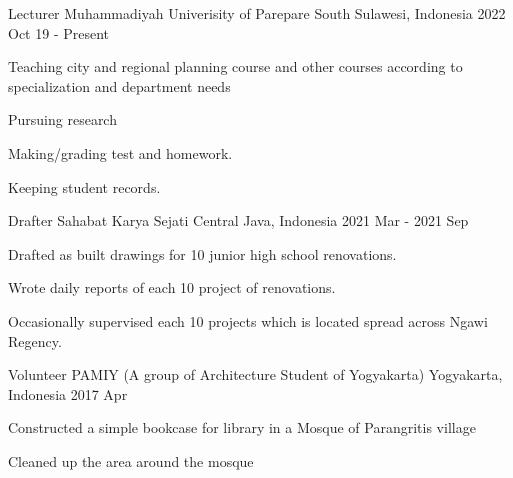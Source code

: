 

\begin{cventries}

  \cventry
    {Lecturer} %
    {Muhammadiyah Univerisity of Parepare} %
    {South Sulawesi, Indonesia} %
    {2022 Oct 19  - Present} %
    {
      \begin{cvitems} %
      \item{Teaching city and regional planning course and other courses according to specialization and department needs}
      \item{Pursuing research}
        \item {Making/grading test and homework.}
        \item{Keeping student records.}
      \end{cvitems}
    }
  \cventry
    {Drafter} %
    {Sahabat Karya Sejati} %
    {Central Java, Indonesia} %
    {2021 Mar - 2021 Sep} %
    {
      \begin{cvitems} %
        \item {Drafted as built drawings for 10 junior high school renovations.}
        \item{Wrote daily reports of each 10 project of renovations.}
        \item{Occasionally supervised each 10 projects which is located spread across Ngawi Regency.}
      \end{cvitems}
    }

  \cventry
    {Volunteer} %
    {PAMIY (A group of Architecture Student of Yogyakarta)} %
    {Yogyakarta, Indonesia} %
    {2017 Apr} %
    {
      \begin{cvitems} %
        \item {Constructed a simple bookcase for library in a Mosque of Parangritis village }
        \item{Cleaned up the area around the mosque}
      \end{cvitems}
    }


\end{cventries}
